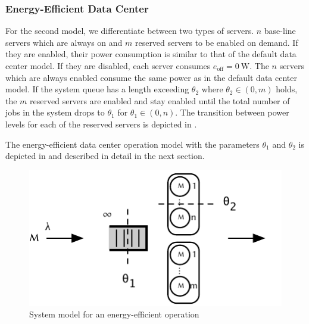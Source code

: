 \subsubsection*{Energy-Efficient Data Center}\label{sec:cloud:data_centers:problem_formulation:energy_efficient_data_center}
For the second model, we differentiate between two types of servers.
\(n\) base-line servers which are always on and \(m\) reserved servers to be enabled on demand.
If they are enabled, their power consumption is similar to that of the default data center model.
If they are disabled, each server consumes \(e_\text{off} = \SI{0}{\watt}\).
The \(n\) servers which are always enabled consume the same power as in the default data center model.
If the system queue has a length exceeding \(\theta_2\) where \(\theta_2 \in (0, m)\) holds, the \(m\) reserved servers are enabled and stay enabled until the total number of jobs in the system drops to \(\theta_1\) for \(\theta_1 \in (0, n)\).
The transition between power levels for each of the reserved servers is depicted in .

The energy-efficient data center operation model with the parameters \(\theta_1\) and \(\theta_2\) is depicted in  and described in detail in the next section.

\begin{figure}
  \centering
  \includegraphics{cloud/data_centers/problem_formulation/figures/model}
  \caption{System model for an energy-efficient operation}
  \label{fig:cloud:data_centers:problem_formulation:model}
\end{figure}